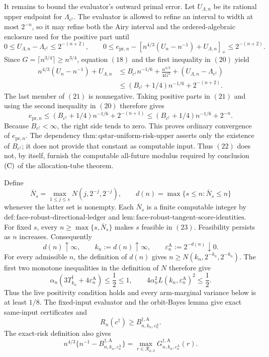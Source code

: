 It remains to bound the evaluator's outward primal error.  Let
\(U_{\Lambda,n}\) be its rational upper endpoint for
\(\Lambda_{c^\dagger}\).  The evaluator is allowed to refine an interval to
width at most \(2^{-n}\), so it may refine both the Airy interval and the
ordered-algebraic enclosure used for the positive part until
\[
 0\le U_{\Lambda,n}-\Lambda_{c^\dagger}\le2^{-(n+2)},
 \qquad
 0\le e_{\mathrm{pr},n}-
 \left[n^{4/3}(U_n-n^{-1})+U_{\Lambda,n}\right]_+
 \le2^{-(n+2)}.                                             \tag{20}
\]
Since \(G=\lceil n^{3/4}\rceil\ge n^{3/4}\), equation \((18)\) and the
first inequality in \((20)\) yield
\[
\begin{aligned}
 n^{4/3}(U_n-n^{-1})+U_{\Lambda,n}
 &\le B_{c^\dagger}n^{-1/6}
 +\frac{n^{4/3}}{4G^2}
 +(U_{\Lambda,n}-\Lambda_{c^\dagger})\\
 &\le (B_{c^\dagger}+1/4)n^{-1/6}+2^{-(n+2)}.               \tag{21}
\end{aligned}
\]
The last member of \((21)\) is nonnegative.  Taking positive parts in
\((21)\) and using the second inequality in \((20)\) therefore gives
\[
 e_{\mathrm{pr},n}
 \le(B_{c^\dagger}+1/4)n^{-1/6}+2^{-(n+1)}
 \le(B_{c^\dagger}+1/4)n^{-1/6}+2^{-n}.                     \tag{22}
\]
Because \(B_{c^\dagger}<\infty\), the right side tends to zero.  This proves
ordinary convergence of \(e_{\mathrm{pr},n}\).  The dependency
\(\mathrm{thm:qstar\text{-}uniform\text{-}risk\text{-}upper}\) asserts only
the existence of \(B_{c^\dagger}\); it does not provide that constant as
computable input.  Thus \((22)\) does not, by itself, furnish the computable
all-future modulus required by conclusion \({\rm(C)}\) of the allocation-tube
theorem.

Define
\[
 \overline N_s=\max_{1\le j\le s}N(j,2^{-j},2^{-j}),
 \qquad
 d(n)=\max\{s\le n:\overline N_s\le n\}                    \tag{23}
\]
whenever the latter set is nonempty.  Each \(\overline N_s\) is a finite
computable integer by
\(\mathrm{def:face\text{-}robust\text{-}directional\text{-}ledger}\) and
\(\mathrm{lem:face\text{-}robust\text{-}tangent\text{-}score\text{-}identities}\).
For fixed \(s\), every
\(n\ge\max\{s,\overline N_s\}\) makes \(s\) feasible in \((23)\).
Feasibility persists as \(n\) increases.  Consequently
\[
 d(n)\uparrow\infty,
 \qquad k_n:=d(n)\uparrow\infty,
 \qquad \varepsilon_n^{\mathrm A}:=2^{-d(n)}\downarrow0.    \tag{24}
\]
For every admissible \(n\), the definition of \(d(n)\) gives
\(n\ge N(k_n,2^{-k_n},2^{-k_n})\).  The first two monotone inequalities in
the definition of \(N\) therefore give
\[
 \alpha_n(3T_{k_n}^\dagger+4\varepsilon_n^{\mathrm A})
 \le\frac12\le1,
 \qquad
 4\alpha_n^2L(k_n,\varepsilon_n^{\mathrm A})^2\le\frac12.   \tag{25}
\]
Thus the live positivity condition holds and every arm-marginal variance below
is at least \(1/8\).  The fixed-input evaluator and the orbit-Bayes lemma give
exact same-input certificates and
\[
 R_n(c^\dagger)
 \ge B_{n,k_n,\varepsilon_n^{\mathrm A}}^{\dagger,\mathrm A}. \tag{26}
\]
The exact-risk definition also gives
\[
 n^{4/3}\{n^{-1}-B_{n,k_n,\varepsilon_n^{\mathrm A}}^{\dagger,\mathrm A}\}
 =\max_{r\in\mathcal R_{n,3}}
 G_{n,k_n,\varepsilon_n^{\mathrm A}}^{\dagger,\mathrm A}(r). \tag{27}
\]

